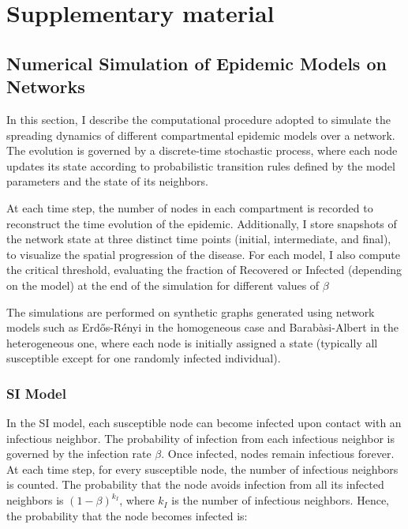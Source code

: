 \chapter{Supplementary material}


\section{Numerical Simulation of Epidemic Models on Networks}
\label{app:Numerical_simulations}
In this section, I describe the computational procedure adopted to simulate the spreading dynamics of different compartmental epidemic models over a network. The evolution is governed by a discrete-time stochastic process, where each node updates its state according to probabilistic transition rules defined by the model parameters and the state of its neighbors.

At each time step, the number of nodes in each compartment is recorded to reconstruct the time evolution of the epidemic. Additionally, I store snapshots of the network state at three distinct time points (initial, intermediate, and final), to visualize the spatial progression of the disease. For each model, I also compute the critical threshold, evaluating the fraction of Recovered or Infected (depending on the model) at the end of the simulation for different values of $\beta$


The simulations are performed on synthetic graphs generated using network models such as Erdős-Rényi in the homogeneous case and Barabàsi-Albert in the heterogeneous one, where each node is initially assigned a state (typically all susceptible except for one randomly infected individual).

\subsection{SI Model}

In the SI model, each susceptible node can become infected upon contact with an infectious neighbor. The probability of infection from each infectious neighbor is governed by the infection rate $\beta$. Once infected, nodes remain infectious forever.
At each time step, for every susceptible node, the number of infectious neighbors is counted. The probability that the node avoids infection from all its infected neighbors is $(1 - \beta)^{k_I}$, where $k_I$ is the number of infectious neighbors. Hence, the probability that the node becomes infected is:

